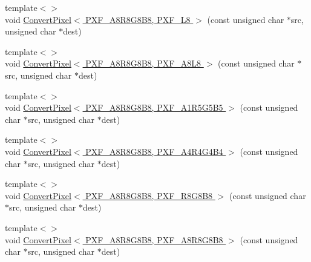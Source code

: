 \begin{DoxyCompactItemize}
{\footnotesize template$<$$>$ }\\void \hyperlink{_convert_pixel_8inl_a48f5312a75f47b2f380f8c9988675ed9}{Convert\+Pixel$<$ P\+X\+F\+\_\+\+A8\+R8\+G8\+B8, P\+X\+F\+\_\+\+L8 $>$} (const unsigned char $\ast$src, unsigned char $\ast$dest)
\item 
{\footnotesize template$<$$>$ }\\void \hyperlink{_convert_pixel_8inl_a0eb24381cc789044729013cec394f840}{Convert\+Pixel$<$ P\+X\+F\+\_\+\+A8\+R8\+G8\+B8, P\+X\+F\+\_\+\+A8\+L8 $>$} (const unsigned char $\ast$src, unsigned char $\ast$dest)
\item 
{\footnotesize template$<$$>$ }\\void \hyperlink{_convert_pixel_8inl_ae5ea2bf8495c23fbfb76000ea69f0250}{Convert\+Pixel$<$ P\+X\+F\+\_\+\+A8\+R8\+G8\+B8, P\+X\+F\+\_\+\+A1\+R5\+G5\+B5 $>$} (const unsigned char $\ast$src, unsigned char $\ast$dest)
\item 
{\footnotesize template$<$$>$ }\\void \hyperlink{_convert_pixel_8inl_a2b0f640950df7166465be83a229a6176}{Convert\+Pixel$<$ P\+X\+F\+\_\+\+A8\+R8\+G8\+B8, P\+X\+F\+\_\+\+A4\+R4\+G4\+B4 $>$} (const unsigned char $\ast$src, unsigned char $\ast$dest)
\item 
{\footnotesize template$<$$>$ }\\void \hyperlink{_convert_pixel_8inl_af2947ef1a294a4d9eff8fb1affe1372d}{Convert\+Pixel$<$ P\+X\+F\+\_\+\+A8\+R8\+G8\+B8, P\+X\+F\+\_\+\+R8\+G8\+B8 $>$} (const unsigned char $\ast$src, unsigned char $\ast$dest)
\item 
{\footnotesize template$<$$>$ }\\void \hyperlink{_convert_pixel_8inl_aa1d27fcb1c6c3789b977d97697ff7460}{Convert\+Pixel$<$ P\+X\+F\+\_\+\+A8\+R8\+G8\+B8, P\+X\+F\+\_\+\+A8\+R8\+G8\+B8 $>$} (const unsigned char $\ast$src, unsigned char $\ast$dest)
\end{DoxyCompactItemize}


